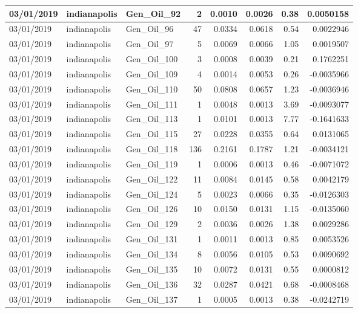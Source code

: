 \documentclass[
  letterpaper,
  DIV=11,
  numbers=noendperiod]{scrartcl}
\begin{document}
\begin{tabular}{l|l|l|r|r|r|r|r}
\hline
03/01/2019 & indianapolis & Gen\_Oil\_92 & 2 & 0.0010 & 0.0026 & 0.38 & 0.0050158\\
\hline
03/01/2019 & indianapolis & Gen\_Oil\_96 & 47 & 0.0334 & 0.0618 & 0.54 & 0.0022946\\
\hline
03/01/2019 & indianapolis & Gen\_Oil\_97 & 5 & 0.0069 & 0.0066 & 1.05 & 0.0019507\\
\hline
03/01/2019 & indianapolis & Gen\_Oil\_100 & 3 & 0.0008 & 0.0039 & 0.21 & 0.1762251\\
\hline
03/01/2019 & indianapolis & Gen\_Oil\_109 & 4 & 0.0014 & 0.0053 & 0.26 & -0.0035966\\
\hline
03/01/2019 & indianapolis & Gen\_Oil\_110 & 50 & 0.0808 & 0.0657 & 1.23 & -0.0036946\\
\hline
03/01/2019 & indianapolis & Gen\_Oil\_111 & 1 & 0.0048 & 0.0013 & 3.69 & -0.0093077\\
\hline
03/01/2019 & indianapolis & Gen\_Oil\_113 & 1 & 0.0101 & 0.0013 & 7.77 & -0.1641633\\
\hline
03/01/2019 & indianapolis & Gen\_Oil\_115 & 27 & 0.0228 & 0.0355 & 0.64 & 0.0131065\\
\hline
03/01/2019 & indianapolis & Gen\_Oil\_118 & 136 & 0.2161 & 0.1787 & 1.21 & -0.0034121\\
\hline
03/01/2019 & indianapolis & Gen\_Oil\_119 & 1 & 0.0006 & 0.0013 & 0.46 & -0.0071072\\
\hline
03/01/2019 & indianapolis & Gen\_Oil\_122 & 11 & 0.0084 & 0.0145 & 0.58 & 0.0042179\\
\hline
03/01/2019 & indianapolis & Gen\_Oil\_124 & 5 & 0.0023 & 0.0066 & 0.35 & -0.0126303\\
\hline
03/01/2019 & indianapolis & Gen\_Oil\_126 & 10 & 0.0150 & 0.0131 & 1.15 & -0.0135060\\
\hline
03/01/2019 & indianapolis & Gen\_Oil\_129 & 2 & 0.0036 & 0.0026 & 1.38 & 0.0029286\\
\hline
03/01/2019 & indianapolis & Gen\_Oil\_131 & 1 & 0.0011 & 0.0013 & 0.85 & 0.0053526\\
\hline
03/01/2019 & indianapolis & Gen\_Oil\_134 & 8 & 0.0056 & 0.0105 & 0.53 & 0.0090692\\
\hline
03/01/2019 & indianapolis & Gen\_Oil\_135 & 10 & 0.0072 & 0.0131 & 0.55 & 0.0000812\\
\hline
03/01/2019 & indianapolis & Gen\_Oil\_136 & 32 & 0.0287 & 0.0421 & 0.68 & -0.0008468\\
\hline
03/01/2019 & indianapolis & Gen\_Oil\_137 & 1 & 0.0005 & 0.0013 & 0.38 & -0.0242719\\

\end{tabular}
\end{document}
